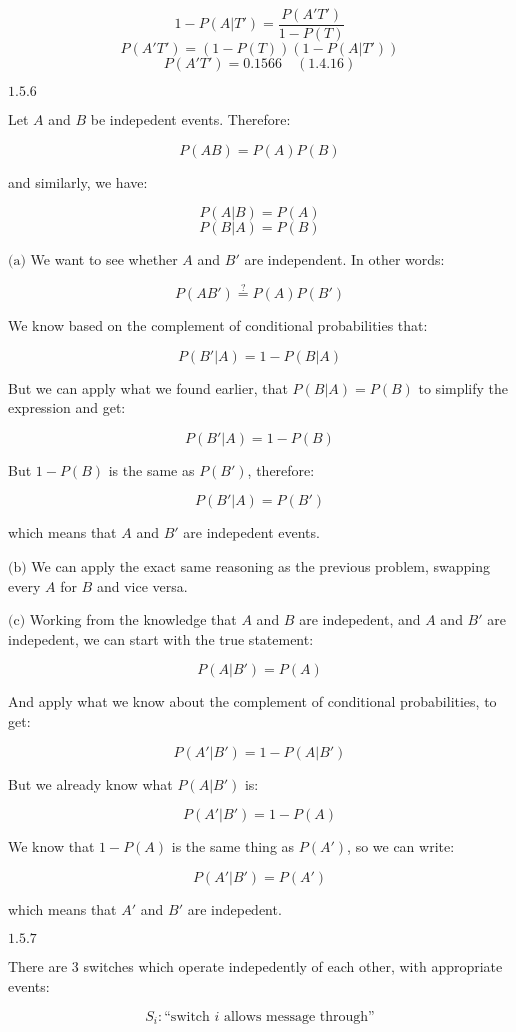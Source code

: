 \documentclass{article}
\newcommand{\problem}[2]{$\boxed{\text{#1.#2}}$}
\newcommand{\subproblem}[3]{$\boxed{\text{(#3)}}$}
\newcommand{\solution}[3]{\boxed{#3\quad(\text{#1.#2})}}
\begin{document}
\[
1-P(A|T')=\dfrac{P(A'T')}{1-P(T)}
\] \[
P(A'T')=(1-P(T))(1-P(A|T'))
\] \[
\solution{1.4}{16}{P(A'T')=0.1566}
\]

%
\problem{1.5}{6}

Let $A$ and $B$ be indepedent events. Therefore:

\[
P(AB)=P(A)P(B)
\]

and similarly, we have:

\[
P(A|B)=P(A)
\] \[
P(B|A)=P(B)
\]

%
\subproblem{1.5}{6}{a} We want to see whether $A$ and $B'$ are
independent. In other words:

\[
P(AB')\overset{?}{=}P(A)P(B')
\]

We know based on the complement of conditional probabilities that:

\[
P(B'|A)=1-P(B|A)
\]

But we can apply what we found earlier, that $P(B|A)=P(B)$ to
simplify the expression and get:

\[
P(B'|A)=1-P(B)
\]

But $1-P(B)$ is the same as $P(B')$, therefore:

\[
P(B'|A)=P(B')
\]

which means that $A$ and $B'$ are indepedent events.

%
\subproblem{1.5}{6}{b} We can apply the exact same reasoning as the
previous problem, swapping every $A$ for $B$ and vice versa.

%
\subproblem{1.5}{6}{c} Working from the knowledge that $A$ and $B$ are
indepedent, and $A$ and $B'$ are indepedent, we can start with the
true statement:

\[
P(A|B')=P(A)
\]

And apply what we know about the complement of conditional
probabilities, to get:

\[
P(A'|B')=1-P(A|B')
\]

But we already know what $P(A|B')$ is:

\[
P(A'|B')=1-P(A)
\]

We know that $1-P(A)$ is the same thing as $P(A')$, so we can write:

\[
P(A'|B')=P(A')
\]

which means that $A'$ and $B'$ are indepedent.

%
\problem{1.5}{7}

There are 3 switches which operate indepedently of each other, with
appropriate events:

\[
S_i:\text{``switch $i$ allows message through''}
\]
\end{document}
